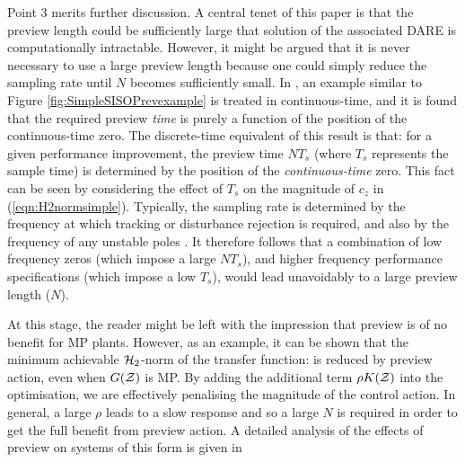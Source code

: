Point 3 merits further discussion. A central tenet of this paper is that the preview length could be sufficiently large that solution of the associated {DARE} is computationally intractable. However, it might be argued that it is never necessary to use a large preview length because one could simply reduce the sampling rate until $N$ becomes sufficiently small.  In \cite{Middleteon_2004_PrevPerf}, an example similar to Figure \ref{fig:SimpleSISOPrevexample} is treated in continuous-time, and it is found that the required preview \textit{time} is purely a function of the position of the continuous-time zero. The discrete-time equivalent of this result is that: for a given performance improvement, the preview time $NT_s$ (where $T_s$ represents the sample time) is determined by the position of the \textit{continuous-time} zero. This fact can be seen by considering the effect of $T_s$ on the magnitude of $c_z$ in (\ref{eqn:H2normsimple}). Typically, the sampling rate is determined by the frequency at which tracking or disturbance rejection is required, and also by the frequency of any unstable poles \citep{Houpis_1991_DigitalControlSystems}. It therefore follows that a combination of low frequency zeros (which impose a large $NT_s$), and higher frequency performance specifications (which impose a low $T_s$), would lead unavoidably to a large preview length ($N$).%


At this stage, the reader might be left with the impression that preview is of no benefit for {MP} plants. However, as an example, it can be shown that the minimum achievable $\mathcal H_2$-norm of the transfer function:
is reduced by preview action, even when $G(\mathcal{Z})$ is {MP}. By adding the additional term $\rho K(\mathcal{Z})$ into the optimisation,
we are effectively penalising the magnitude of the control action. In general, a large $\rho$ leads to a slow response and so a large $N$ is required in order to get the full benefit from preview action. A detailed analysis of the effects of preview on systems of this form is given in \cite[Chapter 4]{Hazell_2007_Thesis}

